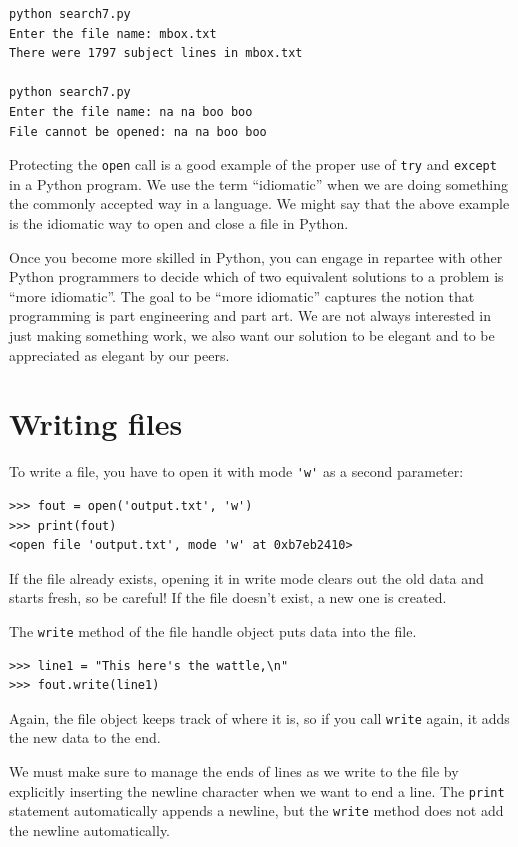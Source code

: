 \beforeverb
\begin{verbatim}
python search7.py
Enter the file name: mbox.txt
There were 1797 subject lines in mbox.txt

python search7.py
Enter the file name: na na boo boo
File cannot be opened: na na boo boo
\end{verbatim}
\afterverb
%

Protecting the {\tt open} call is a good example 
of the proper use of {\tt try}
and {\tt except} in a Python program.  We use the term
``idiomatic'' when we are doing something the commonly accepted way in a language.  We might say that the above example is 
the idiomatic way to open and close a file in Python.

Once you become more skilled in Python, you can engage
in repartee with other Python programmers to decide
which of two equivalent solutions to a problem is 
``more idiomatic''.  The goal to be ``more idiomatic'' 
captures the notion that programming is part engineering
and part art.  We are not always interested
in just making something work, we also want
our solution to be elegant and to be appreciated as 
elegant by our peers.


\section{Writing files}


To write a file, you have to open it with mode
\verb"'w'" as a second parameter:

\beforeverb
\begin{verbatim}
>>> fout = open('output.txt', 'w')
>>> print(fout)
<open file 'output.txt', mode 'w' at 0xb7eb2410>
\end{verbatim}
\afterverb
%
If the file already exists, opening it in write mode clears out
the old data and starts fresh, so be careful!
If the file doesn't exist, a new one is created.

The {\tt write} method of the file handle object 
puts data into the file.

\beforeverb
\begin{verbatim}
>>> line1 = "This here's the wattle,\n"
>>> fout.write(line1)
\end{verbatim}
\afterverb
%
Again, the file object keeps track of where it is, so if
you call {\tt write} again, it adds the new data to the end.

We must make sure to manage the ends of lines as we write
to the file by explicitly inserting the newline character
when we want to end a line.  The {\tt print} statement 
automatically appends a newline, but the {\tt write} 
method does not add the newline automatically.

